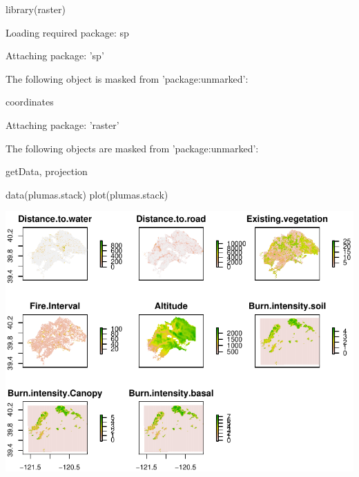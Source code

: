 \documentclass[article]{jss}
\begin{document}
\begin{CodeChunk}
\begin{CodeInput}
library(raster)
\end{CodeInput}
\begin{CodeOutput}
Loading required package: sp
\end{CodeOutput}
\begin{CodeOutput}

Attaching package: 'sp'
\end{CodeOutput}
\begin{CodeOutput}
The following object is masked from 'package:unmarked':

    coordinates
\end{CodeOutput}
\begin{CodeOutput}

Attaching package: 'raster'
\end{CodeOutput}
\begin{CodeOutput}
The following objects are masked from 'package:unmarked':

    getData, projection
\end{CodeOutput}
\begin{CodeInput}
data(plumas.stack)
plot(plumas.stack)
\end{CodeInput}


\begin{center}\includegraphics{diversityocc_files/figure-latex/unnamed-chunk-21-1} \end{center}

\end{CodeChunk}
\end{document}
